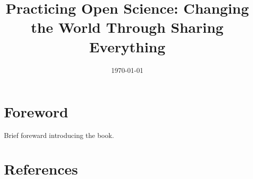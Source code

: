 \documentclass[letterpaper,10pt]{book}
\title{\textbf{Practicing Open Science:
Changing the World Through Sharing Everything}}
\date{\today}
\begin{document}
\maketitle

\newpage
\tableofcontents
\newpage

\section*{Foreword}

Brief foreward introducing the book.









\section*{References}





\end{document}
